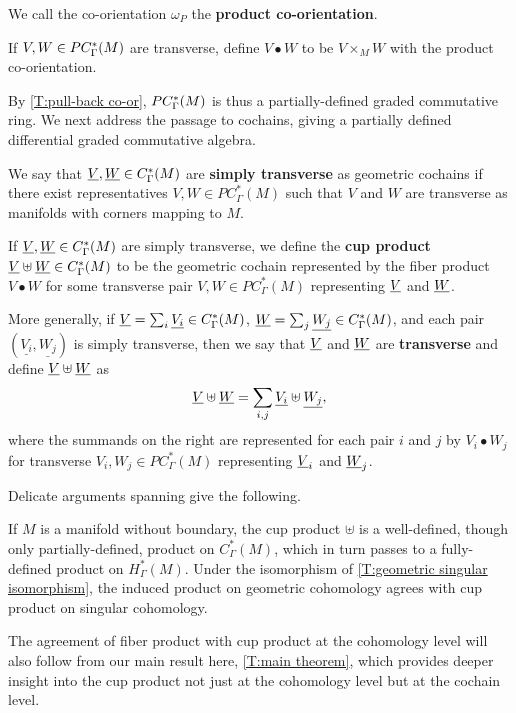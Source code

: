 We call the co-orientation $\omega_P$ the {\bf product co-orientation}.

\begin{definition}
	If $V, W \in PC_\Gamma^*(M)$ are transverse, define $V \bullet W$ to be $V \times_M W$ with the product co-orientation.
\end{definition}

By \cref{T:pull-back co-or}, $ PC_\Gamma^*(M)$ is thus a partially-defined graded commutative ring.
We next address the passage to cochains, giving a partially defined differential graded commutative algebra.

\begin{definition}\label{D:cochain trans}
	We say that $\underline{V}, \underline{W} \in C^*_{\Gamma}(M)$ are \textbf{simply transverse} as geometric cochains if there exist representatives $V,W \in PC^*_\Gamma(M)$ such that $V$ and $W$ are transverse as manifolds with corners mapping to $M$.

	If $\underline{V}, \underline{W} \in C^*_{\Gamma}(M)$ are simply transverse, we define the \textbf{cup product} $\underline{V} \uplus \underline{W} \in C^*_\Gamma(M)$ to be the geometric cochain represented by the fiber product $V \bullet W$ for some transverse pair $V,W \in PC^*_\Gamma(M)$ representing $\underline{V}$ and $\underline{W}$.

	More generally, if $\underline{V} = \sum_i \underline{V_i} \in C_\Gamma^*(M)$, $\underline{W} = \sum_j \underline{W_j} \in C_\Gamma^*(M)$, and each pair $(\underline{V_i},\underline{W_j})$ is simply transverse, then
	we say that $\underline{V}$ and $\underline{W}$ are \textbf{transverse} and define $\underline{V}\uplus\underline{W}$ as
	\[
	\underline{V}\uplus\underline{W} = \sum_{i,j} \underline{V_i}\uplus \underline{W_j},
	\]
	where the summands on the right are represented for each pair $i$ and $j$ by $V_i \bullet W_j$ for transverse $V_i, W_j \in PC^*_\Gamma(M)$ representing $\underline{V}_i$ and $\underline{W}_j$.
\end{definition}

Delicate arguments spanning \cite[Theorems 7.9, 7.14, 7.22, and 7.29]{medina2022foundations} give the following.

\begin{theorem}\label{P:product}
	If $M$ is a manifold without boundary, the cup product $\uplus$ is a well-defined, though only partially-defined, product on $C_\Gamma^*(M)$, which in turn passes to a fully-defined product on $H_\Gamma^*(M)$.
	Under the isomorphism of \cref{T:geometric singular isomorphism}, the induced product on geometric cohomology agrees with cup product on singular cohomology.
\end{theorem}

The agreement of fiber product with cup product at the cohomology level will also follow from our main result here, \cref{T:main theorem}, which provides deeper insight into the cup product not just at the cohomology level but at the cochain level.